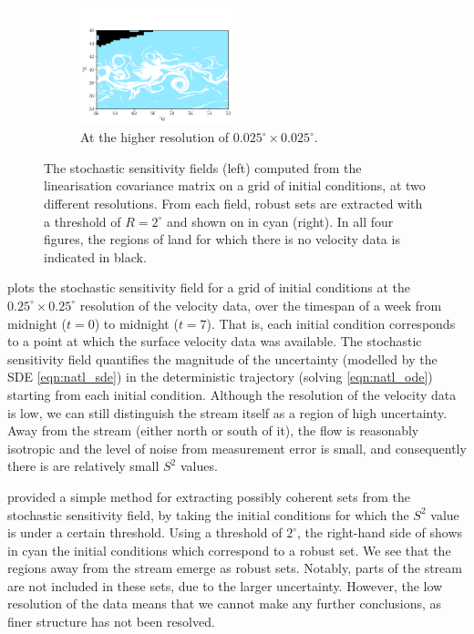 \begin{figure}
\begin{subfigure}{\textwidth}
		\includegraphics[width=0.49\textwidth]{chp06_applications/figures/gulf_stream/S2_robust_high_2.0}
		\caption{At the higher resolution of \(0.025^\circ \times 0.025^\circ\).}
		\label{fig:na_s2_high}
	\end{subfigure}
	\caption{The stochastic sensitivity fields (left) computed from the linearisation covariance matrix on a grid of initial conditions, at two different resolutions.
		From each field, robust sets are extracted with a threshold of \(R = 2^\circ\) and shown on in cyan (right).
		In all four figures, the regions of land for which there is no velocity data is indicated in black.}
	\label{fig:na_s2}
\end{figure}

 plots the stochastic sensitivity field for a grid of initial conditions at the \(0.25^\circ \times 0.25^\circ\) resolution of the velocity data, over the timespan of a week from midnight  (\(t = 0\)) to midnight  (\(t = 7\)).
That is, each initial condition corresponds to a point at which the surface velocity data was available.
The stochastic sensitivity field quantifies the magnitude of the uncertainty (modelled by the SDE \cref{eqn:natl_sde}) in the deterministic trajectory (solving \cref{eqn:natl_ode}) starting from each initial condition.
Although the resolution of the velocity data is low, we can still distinguish the stream itself as a region of high uncertainty.
Away from the stream (either north or south of it), the flow is reasonably isotropic and the level of noise from measurement error is small, and consequently there is are relatively small \(S^2\) values.

\citet{Balasuriya_2020_StochasticSensitivityComputable} provided a simple method for extracting possibly coherent sets from the stochastic sensitivity field, by taking the initial conditions for which the \(S^2\) value is under a certain threshold.
Using a threshold of \(2^\circ\), the right-hand side of  shows in cyan the initial conditions which correspond to a robust set.
We see that the regions away from the stream emerge as robust sets.
Notably, parts of the stream are not included in these sets, due to the larger uncertainty.
However, the low resolution of the data means that we cannot make any further conclusions, as finer structure has not been resolved.

